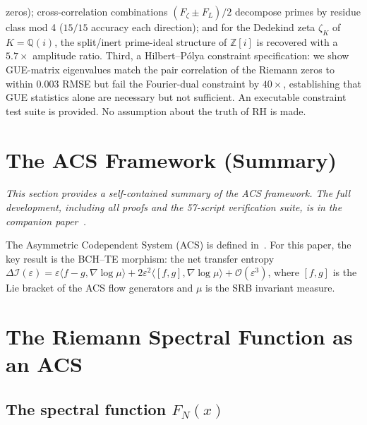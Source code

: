 \documentclass[11pt,a4paper]{article}
\theoremstyle{plain}
\theoremstyle{definition}
\theoremstyle{remark}
\newcommand{\DI}{\Delta\mathcal{I}}
\newcommand{\Order}[1]{\mathcal{O}(#1)}
\newcommand{\eps}{\varepsilon}
\begin{document}
\begin{titlepage}
\begin{center}
\begin{minipage}{0.88\textwidth}
zeros); cross-correlation combinations $(F_\zeta\pm F_L)/2$ decompose
primes by residue class mod 4 ($15/15$ accuracy each direction);
and for the Dedekind zeta $\zeta_K$ of $K=\mathbb{Q}(i)$, the split/inert
prime-ideal structure of $\mathbb{Z}[i]$ is recovered with a $5.7\times$
amplitude ratio.  Third, a Hilbert--P\'{o}lya constraint specification:
we show GUE-matrix eigenvalues match the pair correlation of the Riemann
zeros to within $0.003$ RMSE but fail the Fourier-dual constraint by
$40\times$, establishing that GUE statistics alone are necessary but
not sufficient.  An executable constraint test suite is provided.
No assumption about the truth of RH is made.
\end{minipage}
\end{center}

\vfill

\noindent{\color{acsrule}\rule{\textwidth}{0.4pt}}
\end{titlepage}

\clearpage
{}
\setcounter{page}{1}
\tableofcontents
\clearpage
{}
\setcounter{page}{1}

\section{The ACS Framework (Summary)}
\label{sec:acs}

\noindent\textit{This section provides a self-contained summary of the ACS
framework.  The full development, including all proofs and the 57-script
verification suite, is in the companion paper~\cite{Wallace2026a}.}

\medskip\noindent
The Asymmetric Codependent System (ACS) is defined in~\cite{Wallace2026a}.
For this paper, the key result is the BCH--TE morphism: the net transfer
entropy $\DI(\eps) = \eps\langle f{-}g, \nabla\log\mu\rangle + 2\eps^2\langle[f,g],\nabla\log\mu\rangle + \Order{\eps^3}$, where $[f,g]$ is the Lie bracket of the ACS flow generators and $\mu$ is the SRB invariant measure.
\section{The Riemann Spectral Function as an ACS}
\label{sec:riemann}

\subsection{The spectral function \texorpdfstring{$F_N(x)$}{F\_N(x)}}
\end{document}
